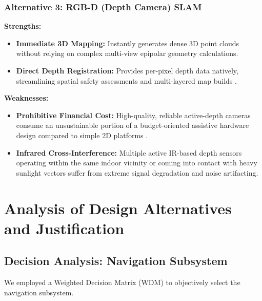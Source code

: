 \documentclass[12pt,a4paper]{report}
\begin{document}
\subsubsection{Alternative 3: RGB-D (Depth Camera) SLAM}

\textbf{Strengths:}
\begin{itemize}[leftmargin=*,itemsep=2pt]
    \item \textbf{Immediate 3D Mapping:} Instantly generates dense 3D point clouds without relying on complex multi-view epipolar geometry calculations.
    \item \textbf{Direct Depth Registration:} Provides per-pixel depth data natively, streamlining spatial safety assessments and multi-layered map builds \cite{cui_2024}.
\end{itemize}

\textbf{Weaknesses:}
\begin{itemize}[leftmargin=*,itemsep=2pt]
    \item \textbf{Prohibitive Financial Cost:} High-quality, reliable active-depth cameras consume an unsustainable portion of a budget-oriented assistive hardware design compared to simple 2D platforms \cite{grandview_market,rplidar_a1m8}.
    \item \textbf{Infrared Cross-Interference:} Multiple active IR-based depth sensors operating within the same indoor vicinity or coming into contact with heavy sunlight vectors suffer from extreme signal degradation and noise artifacting.
\end{itemize}



\section{Analysis of Design Alternatives and Justification}

\subsection{Decision Analysis: Navigation Subsystem}

We employed a Weighted Decision Matrix (WDM) to objectively select the navigation subsystem.
\end{document}
